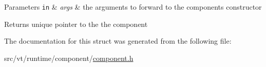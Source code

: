 \begin{DoxyParams}[1]{Parameters}
\mbox{\tt in}  & {\em args} & the arguments to forward to the component\textquotesingle{}s constructor\\
\hline
\end{DoxyParams}
\begin{DoxyReturn}{Returns}
unique pointer to the the component 
\end{DoxyReturn}


The documentation for this struct was generated from the following file\+:\begin{DoxyCompactItemize}
\item 
src/vt/runtime/component/\hyperlink{component_8h}{component.\+h}\end{DoxyCompactItemize}
